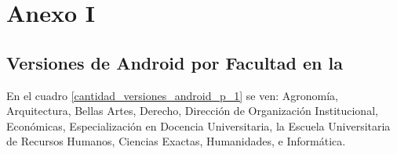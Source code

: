 \newpage  
\section{Anexo I}
\label{anexo1}

\subsection{Versiones de Android por Facultad en la \unlp{}}
\label{cantidad_versiones_android_unlp}

En el cuadro \ref{cantidad_versiones_android_p_1} se ven: Agronomía, Arquitectura, Bellas Artes, Derecho, Dirección de Organización Institucional, Económicas, Especialización en Docencia Universitaria, la Escuela Universitaria de Recursos Humanos, Ciencias Exactas, Humanidades, e Informática.


